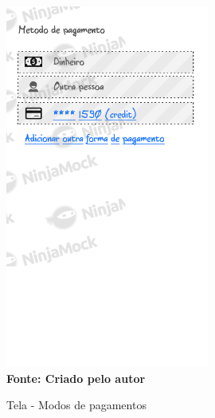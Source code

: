 \begin{figure}[ht]
	\centering	
	\caption[\hspace{0.1cm}]{Tela - Modos de pagamentos}
	\vspace{-0.4cm}
	\includegraphics[width=0.6\textwidth]{figuras/c_payment.png}
	 \vspace{-0.2cm}
	\\\textbf{\footnotesize Fonte: Criado pelo autor }
	\label{fig:w3}
\end{figure}
\vspace{-0.5cm}

